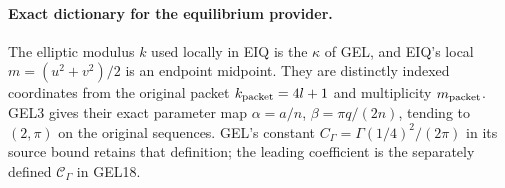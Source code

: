 \documentclass[11pt,a4paper]{article}
\begin{document}
\paragraph{Exact dictionary for the equilibrium provider.}
The elliptic modulus $k$ used locally in EIQ is the $\kappa$ of GEL,
and EIQ's local $m=(u^2+v^2)/2$ is an endpoint midpoint. They are
distinctly indexed coordinates from the original packet
$k_{\rm packet}=4l+1$ and multiplicity $m_{\rm packet}$.
GEL3 gives their exact parameter map
$\alpha=a/n$, $\beta=\pi q/(2n)$, tending to $(2,\pi)$ on
the original sequences. GEL's constant $C_\Gamma=\Gamma(1/4)^2/(2\pi)$
in its source bound retains that definition; the leading coefficient
is the separately defined $\mathcal C_\Gamma$ in GEL18.



\end{document}
